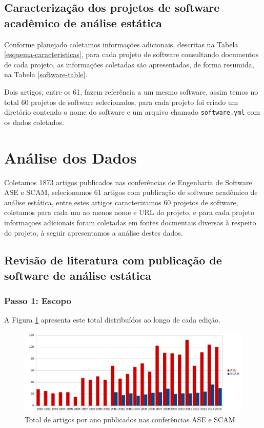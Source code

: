 \subsection{Caracterização dos projetos de software acadêmico de análise estática}

Conforme planejado coletamos informações adicionais, descritas na Tabela
\ref{esquema-caracteristicas}, para cada projeto de software consultando
documentos de cada projeto, as informações coletadas são apresentadas, de forma
resumida, na Tabela \ref{software-table}.



Dois artigos, entre os 61, fazem referência a um mesmo software, assim temos no
total 60 projetos de software selecionados, para cada projeto foi criado um
diretório contendo o nome do software e um arquivo chamado
\texttt{software.yml} com os dados coletados.


\section{Análise dos Dados} \label{estudo1:analise}

Coletamos 1873 artigos publicados nas conferências de Engenharia de Software
ASE e SCAM, selecionamos 61 artigos com publicação de software acadêmico de
análise estática, entre estes artigos caracterizamos 60 projetos de software,
coletamos para cada um ao menos nome e URL do projeto, e para cada projeto
informaçoes adicionais foram coletadas em fontes docmentais diversas à respeito
do projeto, à seguir apresentamos a análise destes dados.

\subsection{Revisão de literatura com publicação de software de análise estática}

\subsubsection{Passo 1: Escopo}

A Figura \ref{artigos-por-ano} apresenta este total distribuídos ao longo de
cada edição.

\begin{figure}[h]
  \center
  \includegraphics[scale=0.65]{imagens/artigos-por-ano.png}
  \caption{Total de artigos por ano publicados nas conferências ASE e SCAM.}
  \label{artigos-por-ano}
\end{figure}

